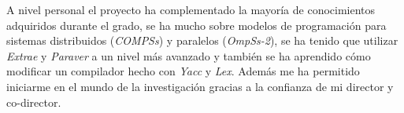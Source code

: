 \par\bigskip

A nivel personal el proyecto ha complementado la mayoría de conocimientos adquiridos durante el grado, se ha mucho sobre modelos de programación para sistemas distribuidos (\textit{COMPSs}) y paralelos (\textit{OmpSs-2}), se ha tenido que utilizar \textit{Extrae} y \textit{Paraver} a un nivel más avanzado y también se ha aprendido cómo modificar un compilador hecho con \textit{Yacc} y \textit{Lex}. Además me ha permitido iniciarme en el mundo de la investigación gracias a la confianza de mi director y co-director.
